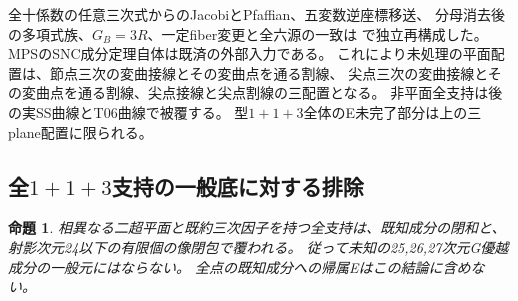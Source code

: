 \documentclass[a4paper,11pt]{ltjsarticle}
\newtheorem{proposition}{命題}[section]
\theoremstyle{definition}
\begin{document}
全十係数の任意三次式からのJacobiとPfaffian、五変数逆座標移送、
分母消去後の多項式族、$G_B=3R$、一定fiber変更と全六源の一致は
で独立再構成した。
MPSのSNC成分定理自体は既済の外部入力である。
これにより未処理の平面配置は、節点三次の変曲接線とその変曲点を通る割線、
尖点三次の変曲接線とその変曲点を通る割線、尖点接線と尖点割線の三配置となる。
非平面全支持は後の実SS曲線とT06曲線で被覆する。
型$1+1+3$全体のE未完了部分は上の三plane配置に限られる。


\subsection{全$1+1+3$支持の一般底に対する排除}
\begin{proposition}\label{prop:two-hyperplanes-cubic-G}
相異なる二超平面と既約三次因子を持つ全支持は、既知成分の閉和と、
射影次元24以下の有限個の像閉包で覆われる。
従って未知の25,26,27次元G優越成分の一般元にはならない。
全点の既知成分への帰属Eはこの結論に含めない。
\end{proposition}
\end{document}
